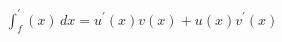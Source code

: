 \documentclass[preview]{standalone}
\begin{document}
\begin{align*}
\int_ f^\prime(x)\,dx = u^\prime(x)v(x) + u(x)v^\prime(x)
\end{align*}
\end{document}
